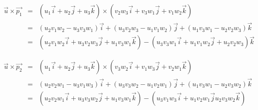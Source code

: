 \begin{eqnarray*}
\vec{u}\times\vec{p_1}&=& \left(u_1\vec{i}+u_2\vec{j}+u_3\vec{k}\right)\times \left(v_2w_3\vec{i}+v_3w_1\vec{j}+v_1w_2\vec{k}\right)\\
&=&\left(u_2v_1w_2-u_3v_3w_1\right)\vec{i}+\left(u_3v_2w_3-u_1v_1w_2\right)\vec{j}+\left(u_1v_3w_1-u_2v_2w_3\right)\vec{k}\\
&=&\left(u_2v_1w_2\vec{i}+u_3v_2w_3\vec{j}+u_1v_3w_1\vec{k}\right)-\left(u_3v_3w_1\vec{i}+u_1v_1w_2\vec{j}+u_2v_2w_3\right)\vec{k}
\end{eqnarray*}

\begin{eqnarray*}
\vec{u}\times\vec{p_2}&=& \left(u_1\vec{i}+u_2\vec{j}+u_3\vec{k}\right)\times \left(v_3w_2\vec{i}+v_1w_3\vec{j}+v_2w_1\vec{k}\right)\\
&=&\left(u_2v_2w_1-u_3v_1w_3\right)\vec{i}+\left(u_3v_3w_2-u_1v_2w_1\right)\vec{j}+\left(u_1v_3w_1-u_2v_3w_2\right)\vec{k}\\
&=&\left(u_2v_2w_1\vec{i}+u_3v_3w_2\vec{j}+u_1v_3w_1\vec{k}\right)
-\left(u_3v_1w_3\vec{i}+u_1v_2w_1\vec{j}u_2v_3w_2\vec{k}\right)
\end{eqnarray*}

